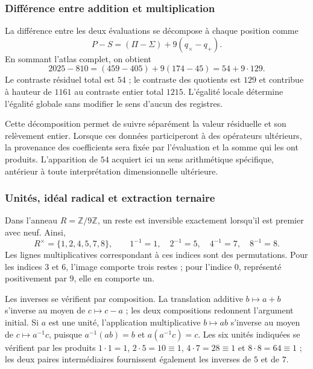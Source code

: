 

\subsubsection{Différence entre addition et multiplication}

La différence entre les deux évaluations se décompose à chaque position comme
\begin{equation}
 P-S=(\Pi-\Sigma)+9(q_\times-q_+).
 \label{eq:app-difference-local}
\end{equation}
En sommant l'atlas complet, on obtient
\begin{equation}
 2025-810=(459-405)+9(174-45)=54+9\cdot129.
 \label{eq:app-difference-global}
\end{equation}
Le contraste résiduel total est $54$ ; le contraste des quotients est $129$ et contribue à hauteur de $1161$ au contraste entier total $1215$. L'égalité locale détermine l'égalité globale sans modifier le sens d'aucun des registres.

Cette décomposition permet de suivre séparément la valeur résiduelle et son relèvement entier. Lorsque ces données participeront à des opérateurs ultérieurs, la provenance des coefficients sera fixée par l'évaluation et la somme qui les ont produits. L'apparition de $54$ acquiert ici un sens arithmétique spécifique, antérieur à toute interprétation dimensionnelle ultérieure.

\subsubsection{Unités, idéal radical et extraction ternaire}

Dans l'anneau $R=\mathbb Z/9\mathbb Z$, un reste est inversible exactement lorsqu'il est premier avec neuf. Ainsi,
\[
 R^\times=\{1,2,4,5,7,8\},
 \qquad 1^{-1}=1,\quad2^{-1}=5,\quad4^{-1}=7,\quad8^{-1}=8.
\]
Les lignes multiplicatives correspondant à ces indices sont des permutations. Pour les indices $3$ et $6$, l'image comporte trois restes ; pour l'indice $0$, représenté positivement par $9$, elle en comporte un.

Les inverses se vérifient par composition. La translation additive $b\mapsto a+b$ s'inverse au moyen de $c\mapsto c-a$ ; les deux compositions redonnent l'argument initial. Si $a$ est une unité, l'application multiplicative $b\mapsto ab$ s'inverse au moyen de $c\mapsto a^{-1}c$, puisque $a^{-1}(ab)=b$ et $a(a^{-1}c)=c$. Les six unités indiquées se vérifient par les produits $1\cdot1=1$, $2\cdot5=10\equiv1$, $4\cdot7=28\equiv1$ et $8\cdot8=64\equiv1$ ; les deux paires intermédiaires fournissent également les inverses de $5$ et de $7$.

